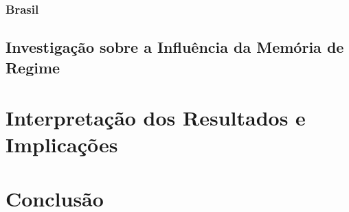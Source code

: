 \subsubsection{Brasil}

\subsection{Investigação sobre a Influência da Memória de Regime}


\section{Interpretação dos Resultados e Implicações}

\section{Conclusão}

